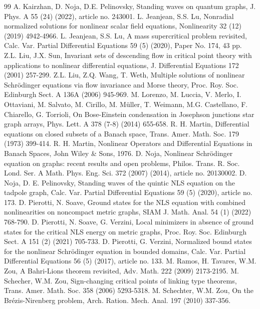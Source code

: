 \documentclass[10pt,a4paper]{article}
\theoremstyle{definition} \theoremstyle{remark}
\numberwithin{equation}{section}
\begin{document}
\begin{thebibliography}{99}
	  A. Kairzhan, D. Noja, D.E. Pelinovsky, Standing waves on quantum graphs, J. Phys. A 55 (24)
	(2022), article no. 243001.
	 L. Jeanjean, S.S. Lu, Nonradial normalized solutions for nonlinear scalar field equations, Nonlinearity 32 (12) (2019) 4942-4966.
	 L. Jeanjean, S.S. Lu, A mass supercritical problem revisited, Calc. Var. Partial Differential Equations 59 (5) (2020), Paper No. 174, 43 pp. 
	  Z.L. Liu, J.X. Sun, Invariant sets of descending flow in critical point theory with applications to nonlinear differential equations, J. Differential Equations 172 (2001) 257-299.
	  Z.L. Liu, Z.Q. Wang, T. Weth, Multiple solutions of nonlinear Schr\"odinger equations via flow invariance and Morse theory, Proc. Roy. Soc. Edinburgh Sect. A 136A (2006) 945-969.
	 M. Lorenzo, M. Luccia, V. Merlo, I. Ottaviani, M. Salvato, M. Cirillo, M. M\"uller, T. Weimann, M.G. Castellano, F. Chiarello, G. Torrioli, On Bose-Einstein condensation in Josephson junctions star graph arrays, Phys. Lett. A 378 (7-8) (2014) 655-658.
	  R. H. Martin, Differential equations on closed subsets of a Banach space, Trans. Amer. Math. Soc. 179 (1973) 399-414.
	  R. H. Martin, Nonlinear Operators and Differential Equations in Banach Spaces, John Wiley \& Sons, 1976.
	  D. Noja, Nonlinear Schr\"odinger equation on graphs: recent results and open problems, Philos. Trans. R. Soc. Lond. Ser. A Math. Phys. Eng. Sci. 372 (2007) (2014), article no. 20130002.
	  D. Noja, D. E. Pelinovsky, Standing waves of the quintic NLS equation on the tadpole graph, Calc. Var. Partial Differential Equations 59 (5) (2020), article no. 173.
	  D. Pierotti, N. Soave, Ground states for the NLS equation with combined nonlinearities on
	noncompact metric graphs, SIAM J. Math. Anal. 54 (1) (2022) 768-790.
	  D. Pierotti, N. Soave, G. Verzini, Local minimizers in absence of ground states for the
	critical NLS energy on metric graphs, Proc. Roy. Soc. Edinburgh Sect. A 151 (2) (2021) 705-733.
	  D. Pierotti, G. Verzini, Normalized bound states for the nonlinear Schr\"odinger equation in bounded domains, Calc. Var. Partial Differential Equations 56 (5) (2017), article no. 133.
	  M. Ramos, H. Tavares, W.M. Zou, A Bahri-Lions theorem revisited, Adv. Math. 222 (2009) 2173-2195.
	  M. Schecher, W.M. Zou, Sign-changing critical points of linking type theorems, Trans. Amer. Math. Soc. 358 (2006) 5293-5318.
	  M. Schechter, W.M. Zou, On the Br\'ezis-Nirenberg problem, Arch. Ration. Mech. Anal. 197 (2010) 337-356.

\end{thebibliography}
\end{document}
